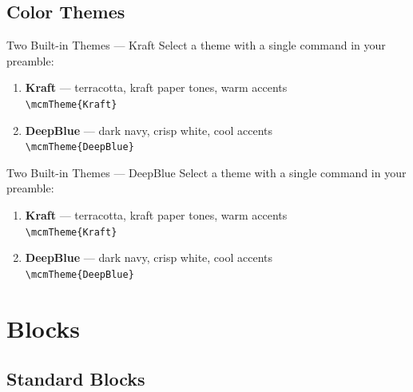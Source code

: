 \documentclass[aspectratio=169]{beamer}
\begin{document}
\subsection{Color Themes}

\begin{frame}{Two Built-in Themes — Kraft}
  Select a theme with a single command in your preamble:
  \begin{enumerate}
    \item \textbf{Kraft} — terracotta, kraft paper tones, warm accents\\
      \texttt{\textbackslash mcmTheme\{Kraft\}}
    \item {\color{mcmBlack!30}%
      \textbf{DeepBlue} — dark navy, crisp white, cool accents\\
      \texttt{\textbackslash mcmTheme\{DeepBlue\}}}
  \end{enumerate}
\end{frame}

{
\begin{frame}{Two Built-in Themes — DeepBlue}
  Select a theme with a single command in your preamble:
  \begin{enumerate}
    \item {\color{mcmBlack!30}%
      \textbf{Kraft} — terracotta, kraft paper tones, warm accents\\
      \texttt{\textbackslash mcmTheme\{Kraft\}}}
    \item \textbf{DeepBlue} — dark navy, crisp white, cool accents\\
      \texttt{\textbackslash mcmTheme\{DeepBlue\}}
  \end{enumerate}
\end{frame}
}

\section{Blocks}

\subsection{Standard Blocks}
\end{document}
